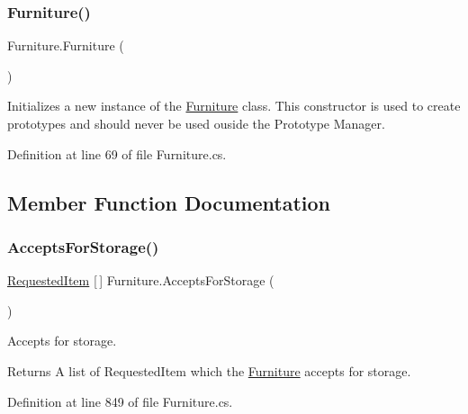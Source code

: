 \subsubsection{\texorpdfstring{Furniture()}{Furniture()}}
{\footnotesize\ttfamily Furniture.\+Furniture (\begin{DoxyParamCaption}{ }\end{DoxyParamCaption})}



Initializes a new instance of the \hyperlink{class_furniture}{Furniture} class. This constructor is used to create prototypes and should never be used ouside the Prototype Manager. 



Definition at line 69 of file Furniture.\+cs.



\subsection{Member Function Documentation}
\mbox{\label{class_furniture_ad88bf85157a61bb143b5347e6492a905}} 
\subsubsection{\texorpdfstring{Accepts\+For\+Storage()}{AcceptsForStorage()}}
{\footnotesize\ttfamily \hyperlink{class_project_porcupine_1_1_jobs_1_1_requested_item}{Requested\+Item} \mbox{[}$\,$\mbox{]} Furniture.\+Accepts\+For\+Storage (\begin{DoxyParamCaption}{ }\end{DoxyParamCaption})}



Accepts for storage. 

\begin{DoxyReturn}{Returns}
A list of Requested\+Item which the \hyperlink{class_furniture}{Furniture} accepts for storage.
\end{DoxyReturn}


Definition at line 849 of file Furniture.\+cs.

\mbox{\label{class_furniture_a65087cef9d54e54fa04cd816cd8a0386}} 
